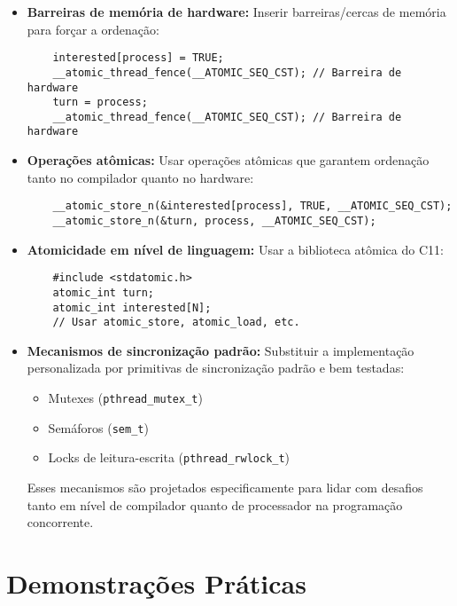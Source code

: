 \documentclass[12pt]{article}
\begin{document}
\begin{itemize}
    \item \textbf{Barreiras de memória de hardware:} Inserir barreiras/cercas de memória para forçar a ordenação:

    \begin{lstlisting}
    interested[process] = TRUE;
    __atomic_thread_fence(__ATOMIC_SEQ_CST); // Barreira de hardware
    turn = process;
    __atomic_thread_fence(__ATOMIC_SEQ_CST); // Barreira de hardware
    \end{lstlisting}

    \item \textbf{Operações atômicas:} Usar operações atômicas que garantem ordenação tanto no compilador quanto no hardware:

    \begin{lstlisting}
    __atomic_store_n(&interested[process], TRUE, __ATOMIC_SEQ_CST);
    __atomic_store_n(&turn, process, __ATOMIC_SEQ_CST);
    \end{lstlisting}

    \item \textbf{Atomicidade em nível de linguagem:} Usar a biblioteca atômica do C11:

    \begin{lstlisting}
    #include <stdatomic.h>
    atomic_int turn;
    atomic_int interested[N];
    // Usar atomic_store, atomic_load, etc.
    \end{lstlisting}

    \item \textbf{Mecanismos de sincronização padrão:} Substituir a implementação personalizada por primitivas de sincronização padrão e bem testadas:
    \begin{itemize}
        \item Mutexes (\texttt{pthread\_mutex\_t})
        \item Semáforos (\texttt{sem\_t})
        \item Locks de leitura-escrita (\texttt{pthread\_rwlock\_t})
    \end{itemize}

    Esses mecanismos são projetados especificamente para lidar com desafios tanto em nível de compilador quanto de processador na programação concorrente.
\end{itemize}
\pagebreak
\section{Demonstrações Práticas}
\end{document}
